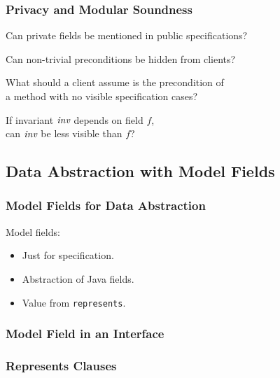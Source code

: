\begin{frame}
\frametitle{Privacy and Modular Soundness}
\begin{question}
Can private fields be mentioned in public specifications?
\end{question}

\pause
\begin{question}
Can non-trivial preconditions be hidden from clients?
\end{question}

\pause
\begin{question}
What should a client assume is the precondition of \\
a method with no visible specification cases?
\end{question}

\pause
\begin{question}
If invariant ${\textit{inv}}$ depends on field $f$, \\
can ${\textit{inv}}$ be less visible than $f$?
\end{question}
\end{frame}

\subsection[Model]{Data Abstraction with Model Fields}

\begin{frame}[fragile]
\frametitle{Model Fields for Data Abstraction}

Model fields:
\begin{itemize}
\item
Just for specification.

\item
Abstraction of Java fields.

\item
Value from \lstinline!represents!.
\end{itemize}
\end{frame}

\begin{frame}[fragile]
\frametitle{Model Field in an Interface}

\end{frame}

\begin{frame}[fragile]
\frametitle{Represents Clauses}

\end{frame}

